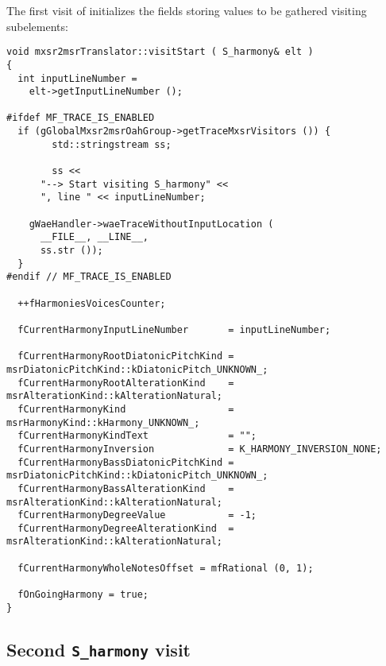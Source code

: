 The first visit of  initializes the fields storing values to be gathered visiting subelements:
\begin{lstlisting}[language=CPlusPlus]
void mxsr2msrTranslator::visitStart ( S_harmony& elt )
{
  int inputLineNumber =
    elt->getInputLineNumber ();

#ifdef MF_TRACE_IS_ENABLED
  if (gGlobalMxsr2msrOahGroup->getTraceMxsrVisitors ()) {
		std::stringstream ss;

		ss <<
      "--> Start visiting S_harmony" <<
      ", line " << inputLineNumber;

    gWaeHandler->waeTraceWithoutInputLocation (
      __FILE__, __LINE__,
      ss.str ());
  }
#endif // MF_TRACE_IS_ENABLED

  ++fHarmoniesVoicesCounter;

  fCurrentHarmonyInputLineNumber       = inputLineNumber;

  fCurrentHarmonyRootDiatonicPitchKind = msrDiatonicPitchKind::kDiatonicPitch_UNKNOWN_;
  fCurrentHarmonyRootAlterationKind    = msrAlterationKind::kAlterationNatural;
  fCurrentHarmonyKind                  = msrHarmonyKind::kHarmony_UNKNOWN_;
  fCurrentHarmonyKindText              = "";
  fCurrentHarmonyInversion             = K_HARMONY_INVERSION_NONE;
  fCurrentHarmonyBassDiatonicPitchKind = msrDiatonicPitchKind::kDiatonicPitch_UNKNOWN_;
  fCurrentHarmonyBassAlterationKind    = msrAlterationKind::kAlterationNatural;
  fCurrentHarmonyDegreeValue           = -1;
  fCurrentHarmonyDegreeAlterationKind  = msrAlterationKind::kAlterationNatural;

  fCurrentHarmonyWholeNotesOffset = mfRational (0, 1);

  fOnGoingHarmony = true;
}
\end{lstlisting}


\subsection{Second {\tt S_harmony} visit}

